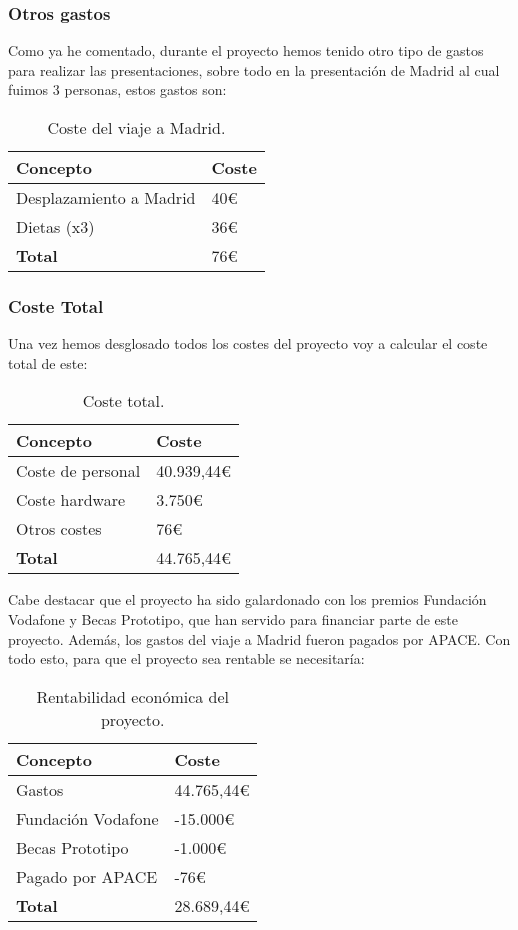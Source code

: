 \subsubsection{Otros gastos}
Como ya he comentado, durante el proyecto hemos tenido otro tipo de gastos para realizar las presentaciones, sobre todo en la presentación de Madrid al cual fuimos 3 personas, estos gastos son:

\begin{table}[H]
	\centering
	\begin{tabular}{ll}
		\toprule
		\textbf{Concepto}       & \textbf{Coste} \\ \midrule
		Desplazamiento a Madrid & 40\euro         \\
		Dietas (x3)             & 36\euro         \\ \midrule
		\textbf{Total}          & 76\euro         \\ \bottomrule
	\end{tabular}
	\caption{Coste del viaje a Madrid.}
\end{table}

\subsubsection{Coste Total}
Una vez hemos desglosado todos los costes del proyecto voy a calcular el coste total de este:

\begin{table}[H]
	\centering
	\begin{tabular}{ll}
		\toprule
		\textbf{Concepto} & \textbf{Coste} \\ \midrule
		Coste de personal & 40.939,44\euro   \\
		Coste hardware    & 3.750\euro       \\
		Otros costes      & 76\euro         \\ \midrule
		\textbf{Total}    & 44.765,44\euro   \\ \bottomrule
	\end{tabular}
	\caption{Coste total.}
\end{table}

Cabe destacar que el proyecto ha sido galardonado con los premios Fundación Vodafone y Becas Prototipo, que han servido para financiar parte de este proyecto. Además, los gastos del viaje a Madrid fueron pagados por APACE. Con todo esto, para que el proyecto sea rentable se necesitaría:

\begin{table}[H]
	\centering
	\begin{tabular}{ll}
		\toprule
		\textbf{Concepto} & \textbf{Coste} \\ \midrule
		Gastos & 44.765,44\euro   \\
		Fundación Vodafone    & -15.000\euro       \\
		Becas Prototipo      & -1.000\euro         \\
		Pagado por APACE      & -76\euro         \\ \midrule
		\textbf{Total}    & 28.689,44\euro   \\ \bottomrule
	\end{tabular}
	\caption{Rentabilidad económica del proyecto.}
\end{table}

